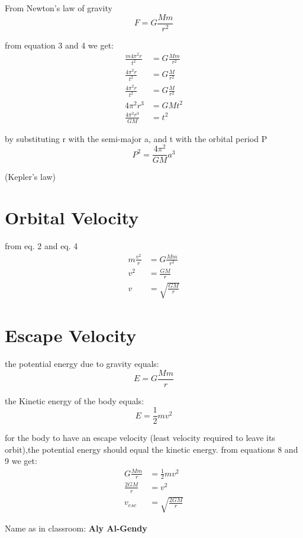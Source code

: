 \documentclass{article}
\begin{document}
\noindent From Newton’s law of gravity
\begin{equation}
    F=G\frac{Mm}{r^2}
\end{equation}

\noindent from equation 3 and 4 we get:
\begin{equation}
\begin{aligned}
    \frac{m4\pi^2r}{t^2}&=G\frac{Mm}{r^2}\\
    \frac{4\pi^2r}{t^2}&=G\frac{M}{r^2}\\
    \frac{4\pi^2r}{t^2}&=G\frac{M}{r^2}\\
    4\pi^2r^3&=GMt^2\\
    \frac{4\pi^2r^3}{GM}&=t^2
\end{aligned}
\end{equation}

\noindent by substituting r with the semi-major a, and t with the orbital period P
\begin{equation}
    P^2=\frac{4\pi^2}{GM}a^3
\end{equation}

\noindent (Kepler’s law)

\section{Orbital Velocity}

\noindent from eq. 2 and eq. 4
\begin{equation}
\begin{aligned}
    m\frac{v^2}{r}&=G\frac{Mm}{r^2}\\
    v^2&=\frac{GM}{r}\\
    v&=\sqrt{\frac{GM}{r}}
\end{aligned}
\end{equation}

\section{Escape Velocity}

the potential energy due to gravity equals:
\begin{equation}
    E=G\frac{Mm}{r}
\end{equation}

\noindent the Kinetic energy of the body equals:
\begin{equation}
    E=\frac{1}{2}mv^2
\end{equation}

\noindent for the body to have an escape velocity (least velocity required to leave its orbit),the potential energy should equal the kinetic energy. from equations 8 and 9 we get:
\begin{equation}
    \begin{aligned}
        G\frac{Mm}{r}&=\frac{1}{2}mv^2\\
        \frac{2GM}{r}&=v^2\\
        v_{esc}&=\sqrt{\frac{2GM}{r}}
    \end{aligned}
\end{equation}

\noindent Name as in classroom: \textbf{Aly Al-Gendy}
\end{document}
